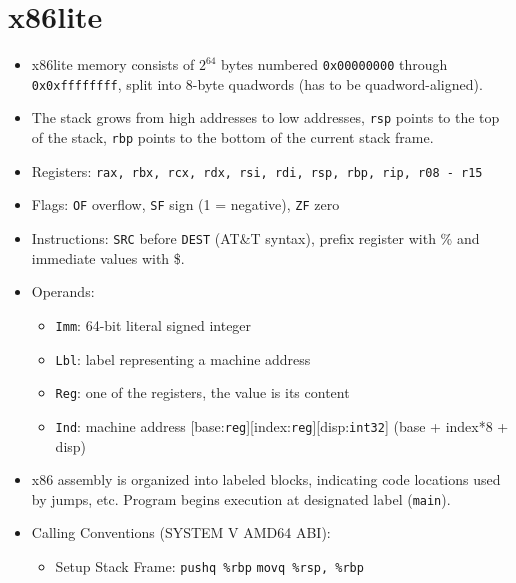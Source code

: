 \section*{x86lite}
\begin{itemize}
	\item x86lite memory consists of $2^{64}$ bytes numbered \texttt{0x00000000} through \texttt{0x0xffffffff}, split into 8-byte quadwords (has to be quadword-aligned).
	
	\item The stack grows from high addresses to low addresses, \texttt{rsp} points to the top of the stack, \texttt{rbp} points to the bottom of the current stack frame.
	
	\item Registers: \texttt{rax, rbx, rcx, rdx, rsi, rdi, rsp, rbp, rip, r08 - r15}
	
	\item Flags: \texttt{OF} overflow, \texttt{SF} sign (1 = negative), \texttt{ZF} zero
	
	\item Instructions: \texttt{SRC} before \texttt{DEST} (AT\&T syntax), prefix register with \% and immediate values with \$.
	
	\item Operands:
	\begin{itemize}
		\item \texttt{Imm}: 64-bit literal signed integer
		\item \texttt{Lbl}: label representing a machine address
		\item \texttt{Reg}: one of the registers, the value is its content
		\item \texttt{Ind}: machine address [base:\texttt{reg}][index:\texttt{reg}][disp:\texttt{int32}] (base + index*8 + disp)
	\end{itemize}
	
	\item x86 assembly is organized into labeled blocks, indicating code locations used by jumps, etc. Program begins execution at designated label (\texttt{main}).
	
	
	\item Calling Conventions (SYSTEM V AMD64 ABI):
	\begin{itemize}
		\item Setup Stack Frame: \newline
			\texttt{pushq \%rbp} \newline 
			\texttt{movq \%rsp, \%rbp}
		

\end{itemize}
\end{itemize}
